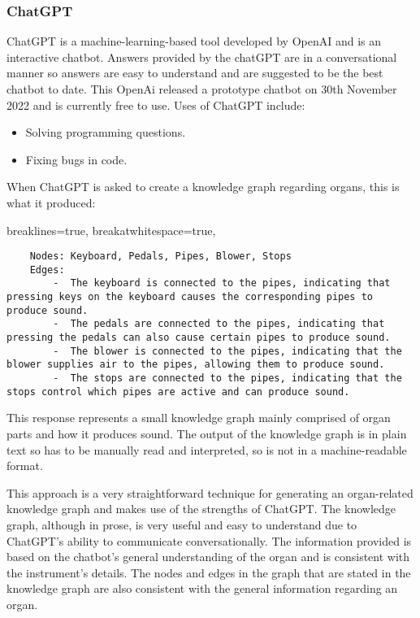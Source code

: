\subsubsection{ChatGPT}
\hspace{0.5cm}  ChatGPT is a machine-learning-based tool developed by OpenAI and is an interactive chatbot. Answers provided by the chatGPT are in a conversational manner so answers are easy to understand and are suggested to be the best chatbot to date. \cite{chatgpt} This OpenAi released a prototype chatbot on 30th November 2022 and is currently free to use. Uses of ChatGPT include:
\begin{itemize}
\item Solving programming questions.
\item Fixing bugs in code.
\end{itemize}

When ChatGPT is asked to create a knowledge graph regarding organs, this is what it produced:

\lstset
{
    breaklines=true,
    breakatwhitespace=true,
}
\begin{lstlisting}
    Nodes: Keyboard, Pedals, Pipes, Blower, Stops
    Edges:
        -  The keyboard is connected to the pipes, indicating that pressing keys on the keyboard causes the corresponding pipes to produce sound.
        -  The pedals are connected to the pipes, indicating that pressing the pedals can also cause certain pipes to produce sound.
        -  The blower is connected to the pipes, indicating that the blower supplies air to the pipes, allowing them to produce sound.
        -  The stops are connected to the pipes, indicating that the stops control which pipes are active and can produce sound.
\end{lstlisting}

This response represents a small knowledge graph mainly comprised of organ parts and how it produces sound. The output of the knowledge graph is in plain text so has to be manually read and interpreted, so is not in a machine-readable format. 

This approach is a very straightforward technique for generating an organ-related knowledge graph and makes use of the strengths of ChatGPT. The knowledge graph, although in prose, is very useful and easy to understand due to ChatGPT's ability to communicate conversationally. The information provided is based on the chatbot's general understanding of the organ and is consistent with the instrument's details. The nodes and edges in the graph that are stated in the knowledge graph are also consistent with the general information regarding an organ. 

